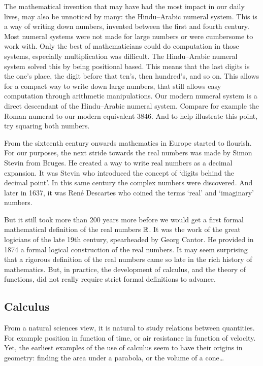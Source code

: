 The mathematical invention that may have had the most impact in our daily lives, may also be unnoticed by many: the Hindu--Arabic numeral system. This is a way of writing down numbers, invented between the first and fourth century. Most numeral systems were not made for large numbers or were cumbersome to work with. Only the best of mathematicians could do computation in those systems, especially multiplication was difficult. The Hindu--Arabic numeral system solved this by being positional based. This means that the last digits is the one's place, the digit before that ten's, then hundred's, and so on. This allows for a compact way to write down large numbers, that still allows easy computation through arithmetic manipulations. Our modern numeral system is a direct descendant of the Hindu--Arabic numeral system. Compare for example the Roman numeral \uppercase\expandafter{\relax} to our modern equivalent $3846$. And to help illustrate this point, try squaring both numbers.

From the sixteenth century onwards mathematics in Europe started to flourish. For our purposes, the next stride towards the real numbers was made by Simon Stevin from Bruges. He created a way to write real numbers as a decimal expansion. It was Stevin who introduced the concept of `digits behind the decimal point'. In this same century the complex numbers were discovered. And later in 1637, it was René Descartes who coined the terms `real' and `imaginary' numbers.

But it still took more than 200 years more before we would get a first formal mathematical definition of the real numbers $\mathbb{R}$. It was the work of the great logicians of the late 19th century, spearheaded by Georg Cantor. He provided in 1874 a formal logical construction of the real numbers. It may seem surprising that a rigorous definition of the real numbers came so late in the rich history of mathematics. But, in practice, the development of calculus, and the theory of functions, did not really require strict formal definitions to advance.

\subsection{Calculus}

From a natural sciences view, it is natural to study relations between quantities. For example position in function of time, or air resistance in function of velocity. Yet, the earliest examples of the use of calculus seem to have their origins in geometry: finding the area under a parabola, or the volume of a cone\dots

